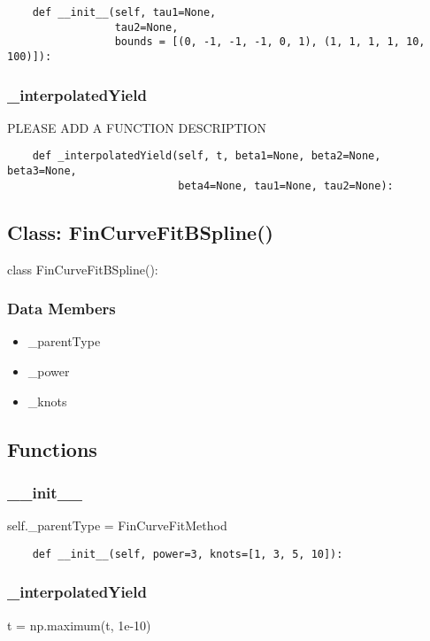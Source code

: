 \documentclass[twoside,11pt]{book}
\begin{document}
\begin{lstlisting}
    def __init__(self, tau1=None, 
                 tau2=None, 
                 bounds = [(0, -1, -1, -1, 0, 1), (1, 1, 1, 1, 10, 100)]):
\end{lstlisting}

\subsubsection*{{\bf \_interpolatedYield}}
PLEASE ADD A FUNCTION DESCRIPTION

\begin{lstlisting}
    def _interpolatedYield(self, t, beta1=None, beta2=None, beta3=None,
                           beta4=None, tau1=None, tau2=None):
\end{lstlisting}

\subsection*{Class: FinCurveFitBSpline()}
class FinCurveFitBSpline(): 

\subsubsection*{Data Members}
\begin{itemize}
\item{\_parentType}
\item{\_power}
\item{\_knots}
\end{itemize}

\subsection*{Functions}

\subsubsection*{{\bf \_\_init\_\_}}
self.\_parentType = FinCurveFitMethod 

\begin{lstlisting}
    def __init__(self, power=3, knots=[1, 3, 5, 10]):
\end{lstlisting}

\subsubsection*{{\bf \_interpolatedYield}}
t = np.maximum(t, 1e-10) 
\end{document}
